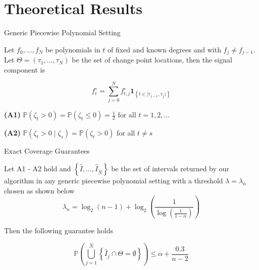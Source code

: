 \documentclass{beamer}
\begin{document}
\section{Theoretical Results}

\begin{frame}
\tableofcontents[currentsection]
\end{frame}

\begin{frame}{Generic Piecewise Polynomial Setting}

\begin{exampleblock}{}
Let $f_{0}, \dots, f_{N}$ be polynomials in $t$ of fixed and known degrees and with  $f_{j} \neq f_{j-1}$. Let $\Theta = \left ( \tau_1, \dots, \tau_N \right ) $ be the set of change point locations, then the signal component is

\begin{equation*}
	f_t^\circ = \sum_{j = 0}^{N} f_{t,j}^\circ \mathbf{1}_{\left \{ t \in [\tau_{j-1}, \tau_j) \right \}}
\end{equation*}
\end{exampleblock}
\bigskip

\textbf{(A1)}  $\mathbb{P} \left ( \zeta_t > 0 \right ) = \mathbb{P} \left ( \zeta_t \leq 0 \right ) = \frac{1}{2}$ for all $t = 1, 2, \dots$

\bigskip 

\textbf{(A2)} $\mathbb{P} \left ( \zeta_t > 0 \mid \zeta_s \right ) = \mathbb{P} \left ( \zeta_t > 0 \right )$ for all $t \neq s$

\end{frame}

\begin{frame}{Exact Coverage Guarantees}
\begin{alertblock}{}
Let A1 - A2 hold and $\left \{ \hat{I}, \dots, \hat{I}_{\hat{N}} \right \}$ be the set of intervals returned by our algorithm in any generic piecewise polynomial setting with a threshold $\lambda = \lambda_n$ chosen as shown below 
\begin{equation*}
	\lambda_n = \log_2 \left ( n - 1 \right ) + \log_2 \left ( \frac{1}{\log \left ( \frac{1}{1-\alpha} \right )} \right )
	\label{equation: naive threshold}
\end{equation*}

Then the following guarantee holds

\begin{equation*}
	\mathbb{P} \left ( \bigcup_{j=1}^{\hat{N}} \left \{ \hat{I}_j \cap \Theta = \emptyset \right \} \right ) \leq \alpha + \frac{0.3}{n-2}
\end{equation*}
\end{alertblock}
\end{frame}
\end{document}
